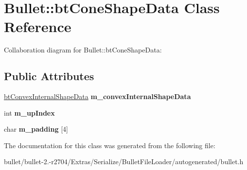 \hypertarget{class_bullet_1_1bt_cone_shape_data}{\section{Bullet\+:\+:bt\+Cone\+Shape\+Data Class Reference}
\label{class_bullet_1_1bt_cone_shape_data}
}


Collaboration diagram for Bullet\+:\+:bt\+Cone\+Shape\+Data\+:
\subsection*{Public Attributes}
\begin{DoxyCompactItemize}
\item 
\hypertarget{class_bullet_1_1bt_cone_shape_data_aca109df11be660b3452094a6a21a171e}{\hyperlink{class_bullet_1_1bt_convex_internal_shape_data}{bt\+Convex\+Internal\+Shape\+Data} {\bfseries m\+\_\+convex\+Internal\+Shape\+Data}}\label{class_bullet_1_1bt_cone_shape_data_aca109df11be660b3452094a6a21a171e}

\item 
\hypertarget{class_bullet_1_1bt_cone_shape_data_a2c245224db1a6a3f766cc9065be6e3a6}{int {\bfseries m\+\_\+up\+Index}}\label{class_bullet_1_1bt_cone_shape_data_a2c245224db1a6a3f766cc9065be6e3a6}

\item 
\hypertarget{class_bullet_1_1bt_cone_shape_data_a5be45cc95e55e271ad98d9b077d273b8}{char {\bfseries m\+\_\+padding} \mbox{[}4\mbox{]}}\label{class_bullet_1_1bt_cone_shape_data_a5be45cc95e55e271ad98d9b077d273b8}

\end{DoxyCompactItemize}


The documentation for this class was generated from the following file\+:\begin{DoxyCompactItemize}
\item 
bullet/bullet-\/2.-\/r2704/\+Extras/\+Serialize/\+Bullet\+File\+Loader/autogenerated/bullet.\+h\end{DoxyCompactItemize}
